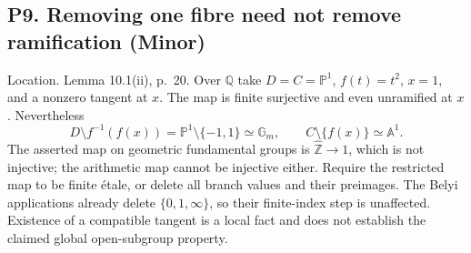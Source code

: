 \documentclass[10pt]{article}
\begin{document}
\subsection*{P9. Removing one fibre need not remove ramification (Minor)}
Location. Lemma 10.1(ii), p. 20. Over \(\mathbb Q\) take \(D=C=\mathbb P^1\), \(f(t)=t^2\), \(x=1\), and a nonzero tangent at \(x\). The map is finite surjective and even unramified at \(x\). Nevertheless \[D\setminus f^{-1}(f(x))=\mathbb P^1\setminus\{-1,1\}\simeq\mathbb G_m,
 \qquad C\setminus\{f(x)\}\simeq\mathbb A^1.\] The asserted map on geometric fundamental groups is \(\widehat{\mathbb Z}\to1\), which is not injective; the arithmetic map cannot be injective either. Require the restricted map to be finite étale, or delete all branch values and their preimages. The Belyi applications already delete \(\{0,1,\infty\}\), so their finite-index step is unaffected. Existence of a compatible tangent is a local fact and does not establish the claimed global open-subgroup property.\par
\end{document}
